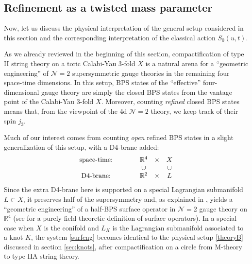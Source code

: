 \documentclass[hyper,letterpaper]{JHEP3}
\newcommand{\be}{\begin{equation}}
\newcommand{\ee}{\end{equation}}
\newcommand{\R}{{\mathbb R}}
\newcommand{\cN}{{\mathcal{N}}}
\begin{document}
\subsection{Refinement as a twisted mass parameter}

Now, let us discuss the physical interpretation of the general setup considered in this section
and the corresponding interpretation of the classical action $S_0 (u,t)$.

As we already reviewed in the beginning of this section, compactification of type II
string theory on a toric Calabi-Yau 3-fold $X$ is a natural arena for a ``geometric engineering''
of $\cN=2$ supersymmetric gauge theories in the remaining four space-time dimensions.
In this setup, BPS states of the ``effective'' four-dimensional gauge theory
are simply the closed BPS states from the vantage point of the Calabi-Yau 3-fold $X$.
Moreover, counting {\it refined} closed BPS states means that, from the viewpoint of the 4d $\cN=2$ theory,
we keep track of their spin $j_3$.

Much of our interest comes from counting {\it open} refined BPS states
in a slight generalization of this setup, with a D4-brane added:
\be
\begin{matrix}
{\mbox{\rm space-time:}} & \qquad & \R^4 & \times & X \\
& \qquad & \cup &  & \cup \\
{\mbox{\rm D4-brane:}} & \qquad & \R^2 & \times & L
\end{matrix}
\label{surfeng}
\ee
Since the extra D4-brane here is supported on a special Lagrangian submanifold $L \subset X$,
it preserves half of the supersymmetry and, as explained in \cite{DGH},
yields a ``geometric engineering'' of a half-BPS surface operator in $\cN=2$ gauge theory on $\R^4$
(see \cite{Ramified,Gknothom,Rigid} for a purely field theoretic definition of surface operators).
In a special case when $X$ is the conifold and $L_K$ is the Lagrangian submanifold associated to a knot $K$,
the system \eqref{surfeng} becomes identical to the physical setup \eqref{theoryB} discussed in section \ref{sec:knots},
after compactification on a circle from M-theory to type IIA string theory.
\end{document}
